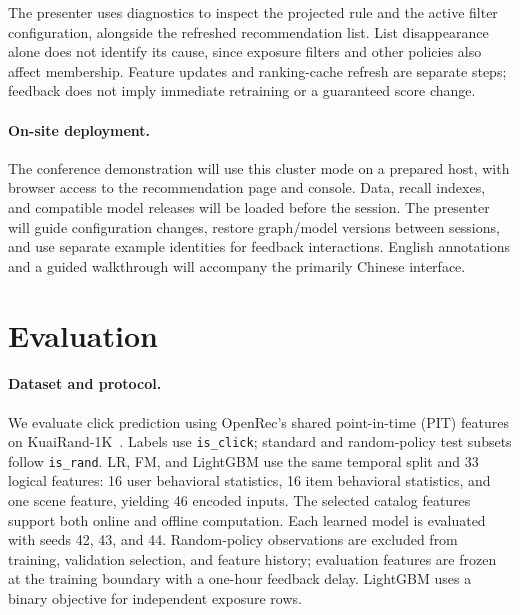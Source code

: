 \documentclass[sigconf,screen,review]{acmart}
\begin{document}
The presenter uses diagnostics to inspect the projected rule and the active filter configuration, alongside the refreshed recommendation list. List disappearance alone does not identify its cause, since exposure filters and other policies also affect membership. Feature updates and ranking-cache refresh are separate steps; feedback does not imply immediate retraining or a guaranteed score change.

\paragraph{On-site deployment.}
The conference demonstration will use this cluster mode on a prepared host, with browser access to the recommendation page and console. Data, recall indexes, and compatible model releases will be loaded before the session. The presenter will guide configuration changes, restore graph/model versions between sessions, and use separate example identities for feedback interactions. English annotations and a guided walkthrough will accompany the primarily Chinese interface.

\section{Evaluation}
\paragraph{Dataset and protocol.}
We evaluate click prediction using OpenRec's shared point-in-time (PIT) features on KuaiRand-1K~\cite{kuairand,experiments}. Labels use \texttt{is\_click}; standard and random-policy test subsets follow \texttt{is\_rand}. LR, FM, and LightGBM use the same temporal split and 33 logical features: 16 user behavioral statistics, 16 item behavioral statistics, and one scene feature, yielding 46 encoded inputs. The selected catalog features support both online and offline computation. Each learned model is evaluated with seeds 42, 43, and 44. Random-policy observations are excluded from training, validation selection, and feature history; evaluation features are frozen at the training boundary with a one-hour feedback delay. LightGBM uses a binary objective for independent exposure rows.
\end{document}
